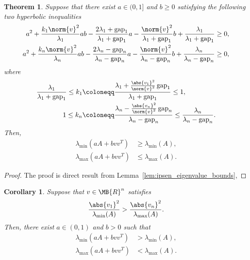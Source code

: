 \documentclass[nobib]{my-handout}
\newtheorem{theorem}{Theorem}
\newtheorem{corollary}{Corollary}
\theoremstyle{definition}
\theoremstyle{remark}
\DeclareMathOperator{\gap}{gap}
\begin{document}
\begin{theorem}
	Suppose that there exist $a \in (0, 1]$ and $b \ge 0$ satisfying the
	following two hyperbolic inequalities
	\begin{align}
		a^2 + \frac{k_1 \norm{v}^2}{\lambda_1} a b - \frac{2 \lambda_1  +
		\gap_1}{\lambda_1 + \gap_1} a - \frac{\norm{v}^2}{\lambda_1 + \gap_1} b +
		\frac{\lambda_1}{\lambda_1 + \gap_1} &\ge 0, \\
		a^2 + \frac{k_n \norm{v}^2}{\lambda_n} a b - \frac{2 \lambda_n -
		\gap_n}{\lambda_n - \gap_n} a - \frac{\norm{v}^2}{\lambda_n - \gap_n} b +
		\frac{\lambda_n}{\lambda_n - \gap_n} &\ge 0,
	\end{align}
	where
	\begin{align*}
		\frac{\lambda_1}{\lambda_1 + \gap_1}
		\le k_1 &\coloneqq \frac{ \lambda_1 + \frac{\abs{v_1}^2}{\norm{v}^2}
		\gap_1}{\lambda_1 + \gap_1}
		\le 1, \\
		1 \le k_n &\coloneqq \frac{\lambda_n - \frac{\abs{v_n}^2}{\norm{v}^2}\gap_n
		}{\lambda_n - \gap_n}
		\le \frac{\lambda_n}{\lambda_n - \gap_n}.
	\end{align*}
	Then,
	\begin{align}
		\lambda_{\min}(a A + b v v^T) &\ge \lambda_{\min}(A), \\
		\lambda_{\max}(a A + b v v^T) &\le \lambda_{\max}(A).
	\end{align}
\end{theorem}

\begin{proof}
	The proof is direct result from Lemma~\ref{lem:ipsen_eigenvalue_bounds},
\end{proof}

\begin{corollary}
	Suppose that $v \in \MB{R}^n$ satisfies
	\begin{equation}
		\frac{\abs{v_1}^2}{\lambda_{\min}(A)} >
		\frac{\abs{v_n}^2}{\lambda_{\max}(A)}.
	\end{equation}
	Then, there exist $a \in (0, 1)$ and $b > 0$ such that
	\begin{align}
		\lambda_{\min}(a A + b v v^T) &> \lambda_{\min}(A), \\
		\lambda_{\max}(a A + b v v^T) &< \lambda_{\max}(A).
	\end{align}
\end{corollary}
\end{document}
